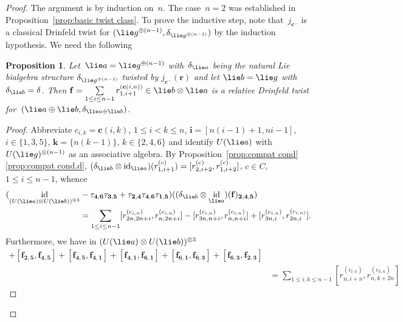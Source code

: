 \documentclass[12pt, reqno]{amsart}
\newtheorem{proposition}[theorem]{Proposition}
\theoremstyle{definition}
\numberwithin{equation}{section}
\newcommand{\tensor}{\otimes}
\DeclareMathOperator{\id}{id}
\begin{document}
\begin{proof}
The argument is by induction on~$n$. The case~$n=2$ was established in Proposition~\ref{prop:basic twist class}. To prove the inductive step, note 
that~$j_{\mathbf c^-}$ is a classical Drinfeld twist for $(\lie g^{\oplus(n-1)},
\delta_{\lie g^{\oplus(n-1)}})$ by the induction hypothesis.
We need the following
\begin{proposition}\label{prop:key prop classical}
Let~$\lie a=\lie g^{\oplus(n-1)}$ with~$\delta_{\lie a}$
being the natural Lie bialgebra structure $\delta_{\lie g^{\oplus(n-1)}}$ twisted by 
$j_{\mathbf c^-}(\mathbf r)$ and let $\lie b=\lie g$
with~$\delta_{\lie b}=\delta$. Then $\mathbf f=\sum\limits_{1\le i\le n-1}
r_{1,i+1}^{(\mathbf c(i,n))}\in \lie b\tensor \lie a$ is a relative Drinfeld twist for~$(\lie a\oplus \lie b,
\delta_{\lie a\oplus\lie b})$. 
\end{proposition}
\begin{proof}
Abbreviate
$c_{i,k}=\mathbf c(i,k)$, $1\le i<k\le n$,
$\mathbf i=[n(i-1)+1,ni-1]$, $i\in \{1,3,5\}$,
$\mathbf k=\{n(k-1)\}$, $k\in \{2,4,6\}$
and identify $U(\lie a)$ with~$U(\lie g)^{\tensor(n-1)}$ as an associative algebra.
By Proposition~\ref{prop:compat cond}\ref{prop:compat cond.d},
$(\delta_{\lie b}\tensor\id_{\lie a})(r_{1,i+1}^{(c)})=[r_{2,i+2}^{(c)},r_{1,i+2}^{(c)}]$,
$c\in C$, $1\le i\le n-1$, whence 
\begin{align*}
(\id_{(U(\lie a)\tensor U(\lie b))^{\tensor3}}&-\tau_{\mathbf 4,\mathbf 6}\tau_{\mathbf 3,\mathbf 5}+\tau_{\mathbf 2,\mathbf 4}\tau_{\mathbf 4,\mathbf 6}\tau_{\mathbf 1,\mathbf 5})((\delta_{\lie b}\tensor \id_{\lie a})(\mathbf f)_{\mathbf 2,\mathbf 4,\mathbf 5})\\
&=\sum_{1\le i\le n-1} [r_{2n,2n+i}^{(c_{i,n})},r_{n,2n+i}^{(c_{i,n})}]-
[r_{3n,n+i}^{(c_{i,n})},r_{n,n+i}^{(c_{i,n})}]+[r_{3n,i}^{(c_{i,n})},r_{2n,i}^{(c_{i,n)}}].
\end{align*}
Furthermore, we have  in $(U(\lie a)\tensor U(\lie b))^{\tensor 3}$
\begin{align*}
[\mathbf f&_{\mathbf 2,\mathbf 3},\mathbf f_{\mathbf 2,\mathbf 5}]+[\mathbf f_{\mathbf 2,\mathbf 5},\mathbf f_{\mathbf 4,\mathbf 5}]+
[\mathbf f_{\mathbf 4,\mathbf 5},\mathbf f_{\mathbf 4,\mathbf 1}]
+[\mathbf f_{\mathbf 4,\mathbf 1},\mathbf f_{\mathbf 6,\mathbf 1}]+[\mathbf f_{\mathbf 6,\mathbf 1},\mathbf f_{\mathbf 6,\mathbf 3}]
+[\mathbf f_{\mathbf 6,\mathbf 3},\mathbf f_{\mathbf 2,\mathbf 3}]\\
&=\sum_{1\le i,k\le n-1} [r_{n,i+n}^{(c_{i,n})},r_{n,k+2n}^{(c_{k,n})}]

\end{align*}
\end{proof}
\end{proof}
\end{document}
